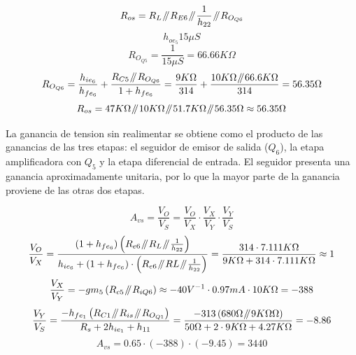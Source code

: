 \documentclass[11pt,a4paper]{article}
\newcommand{\parallelsum}{\mathbin{\!/\mkern-5mu/\!}}
\begin{document}
\begin{equation}
R_{os} = R_L \parallelsum R_{E6} \parallelsum \frac{1}{h_{22}} \parallelsum R_{O_{Q6}}
\end{equation}
\begin{equation}
h_{oe_{5}} 15 \mu S
\end{equation}
\begin{equation}
R_{O_{Q5}} = \frac{1}{15 \mu S} = 66.66K\Omega
\end{equation}
\begin{equation}
R_{O_{Q6}} = \frac{h_{ie_{6}}}{h_{fe_{6}}} + \frac{R_{C5} \parallelsum R_{O_{Q6}}}{1 + h_{fe_{6}}} = \frac{9K\Omega}{314} + \frac{10K\Omega \parallelsum 66.6K\Omega}{314} = 56.35\Omega
\end{equation}
\begin{equation}
R_{os} = 47K\Omega \parallelsum 10K\Omega \parallelsum 51.7K\Omega \parallelsum 56.35\Omega \approx 56.35\Omega
\end{equation}
\par
La ganancia de tension sin realimentar se obtiene como el producto de las ganancias de las tres etapas: el seguidor de emisor de salida (\(Q_6\)), la etapa amplificadora con \(Q_5\) y la etapa diferencial de entrada. El seguidor presenta una ganancia aproximadamente unitaria, por lo que la mayor parte de la ganancia proviene de las otras dos etapas.

\begin{equation}
A_{vs} = \frac{V_O}{V_S} = \frac{V_O}{V_X} \cdot \frac{V_X}{V_Y} \cdot \frac{V_Y}{V_S} 
\end{equation}
\begin{equation}
\frac{V_O}{V_X} = \frac{ \left( 1 + h_{fe_{6}} \right) \left( R_{e6} \parallelsum R_L \parallelsum \frac{1}{h_{22}} \right)}{h_{ie_{6}} + \left( 1 + h_{fe_{6}} \right) \cdot \left( R_{e6} \parallelsum R{L} \parallelsum \frac{1}{h_{22}} \right)} = \frac{ 314 \cdot 7.111K\Omega}{9K\Omega + 314 \cdot 7.111K\Omega} \approx 1 
\end{equation}
\begin{equation}
\frac{V_X}{V_Y} = -gm_5 \left( R_{c5} \parallelsum R_{iQ6} \right) \approx -40V^{-1} \cdot 0.97mA \cdot 10K\Omega = -388
\end{equation}
\begin{equation}
\frac{V_Y}{V_S} = 
\frac{-h_{fe_{1}} \left( R_{C1} \parallelsum R_{is} \parallelsum R_{O_{Q1}} \right) }{R_s + 2 h_{ie_{1}} + h_{11}} = 
\frac{-313 \left( 680\Omega \parallelsum 9K\Omega \Omega \right)}{50\Omega + 2 \cdot 9K\Omega + 4.27K\Omega} = -8.86 
\end{equation}
\begin{equation}
A_{vs} = 0.65 \cdot (-388) \cdot (-9.45) = 3440
\end{equation}
\end{document}
